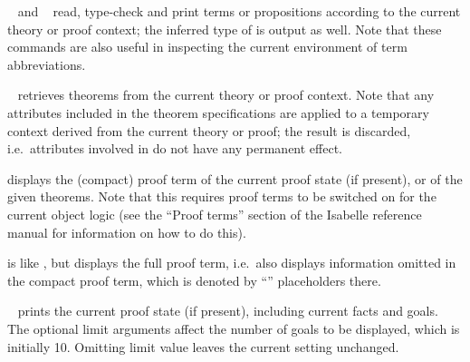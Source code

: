 \begin{isabellebody}
\begin{isamarkuptext}
\begin{description}
  \item \hyperlink{command.term}{\mbox{}}~ and \hyperlink{command.prop}{\mbox{}}~
  read, type-check and print terms or propositions according to the
  current theory or proof context; the inferred type of  is
  output as well.  Note that these commands are also useful in
  inspecting the current environment of term abbreviations.

  \item \hyperlink{command.thm}{\mbox{}}~ retrieves
  theorems from the current theory or proof context.  Note that any
  attributes included in the theorem specifications are applied to a
  temporary context derived from the current theory or proof; the
  result is discarded, i.e.\ attributes involved in  do not have any permanent effect.

  \item \hyperlink{command.prf}{\mbox{}} displays the (compact) proof term of the
  current proof state (if present), or of the given theorems. Note
  that this requires proof terms to be switched on for the current
  object logic (see the ``Proof terms'' section of the Isabelle
  reference manual for information on how to do this).

  \item \hyperlink{command.full-prf}{\mbox{}} is like \hyperlink{command.prf}{\mbox{}}, but displays
  the full proof term, i.e.\ also displays information omitted in the
  compact proof term, which is denoted by ``'' placeholders
  there.

  \item \hyperlink{command.pr}{\mbox{}}~ prints the current proof state
  (if present), including current facts and goals.  The optional limit
  arguments affect the number of goals to be displayed, which is
  initially 10.  Omitting limit value leaves the current setting
  unchanged.


\end{description}
\end{isamarkuptext}
\end{isabellebody}
